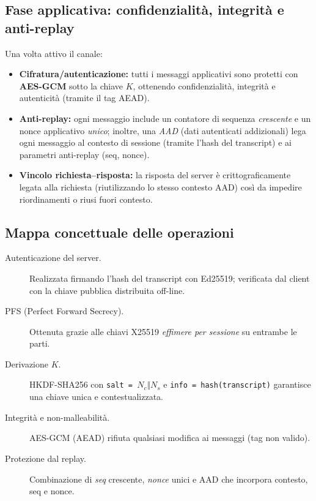 \subsection{Fase applicativa: confidenzialità, integrità e anti-replay}
Una volta attivo il canale:
\begin{itemize}
  \item \textbf{Cifratura/autenticazione:} tutti i messaggi applicativi sono protetti con \textbf{AES-GCM} sotto la chiave $K$, ottenendo confidenzialità, integrità e autenticità (tramite il tag AEAD).
  \item \textbf{Anti-replay:} ogni messaggio include un contatore di sequenza \emph{crescente} e un nonce applicativo \emph{unico}; inoltre, una \emph{AAD} (dati autenticati addizionali) lega ogni messaggio al contesto di sessione (tramite l'hash del transcript) e ai parametri anti-replay (seq, nonce).
  \item \textbf{Vincolo richiesta--risposta:} la risposta del server è crittograficamente legata alla richiesta (riutilizzando lo stesso contesto AAD) così da impedire riordinamenti o riusi fuori contesto.
\end{itemize}

\subsection{Mappa concettuale delle operazioni}
\begin{description}
  \item[Autenticazione del server.] Realizzata firmando l'hash del transcript con Ed25519; verificata dal client con la chiave pubblica distribuita off-line.
  \item[PFS (Perfect Forward Secrecy).] Ottenuta grazie alle chiavi X25519 \emph{effimere per sessione} su entrambe le parti.
  \item[Derivazione $K$.] HKDF-SHA256 con \texttt{salt = $N_c\Vert N_s$} e \texttt{info = hash(transcript)} garantisce una chiave unica e contestualizzata.
  \item[Integrità e non-malleabilità.] AES-GCM (AEAD) rifiuta qualsiasi modifica ai messaggi (tag non valido).
  \item[Protezione dal replay.] Combinazione di \emph{seq} crescente, \emph{nonce} unici e AAD che incorpora contesto, seq e nonce.
\end{description}


